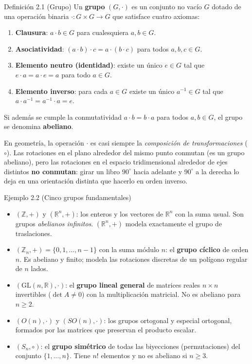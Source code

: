 \documentclass[11pt,letterpaper]{article}
\newcommand{\term}[1]{\textbf{\color{orangeacc}#1}}
\begin{document}
\begin{infobox}[orangeacc]{Definición 2.1 (Grupo)}
Un \term{grupo} $(G,\cdot)$ es un conjunto no vacío $G$ dotado de una operación binaria $\cdot:G\times G\to G$ que satisface cuatro axiomas:
\begin{enumerate}
  \item \term{Clausura}: $a\cdot b\in G$ para cualesquiera $a,b\in G$.
  \item \term{Asociatividad}: $(a\cdot b)\cdot c=a\cdot(b\cdot c)$ para todos $a,b,c\in G$.
  \item \term{Elemento neutro (identidad)}: existe un único $e\in G$ tal que $e\cdot a=a\cdot e=a$ para todo $a\in G$.
  \item \term{Elemento inverso}: para cada $a\in G$ existe un único $a^{-1}\in G$ tal que $a\cdot a^{-1}=a^{-1}\cdot a=e$.
\end{enumerate}
Si además se cumple la conmutatividad $a\cdot b=b\cdot a$ para todos $a,b\in G$, el grupo se denomina \term{abeliano}.
\end{infobox}

En geometría, la operación $\cdot$ es casi siempre la \emph{composición de transformaciones} ($\circ$). Las rotaciones en el plano alrededor del mismo punto conmutan (es un grupo abeliano), pero las rotaciones en el espacio tridimensional alrededor de ejes distintos \textbf{no conmutan}: girar un libro $90^\circ$ hacia adelante y $90^\circ$ a la derecha lo deja en una orientación distinta que hacerlo en orden inverso.

\begin{examplebox}{Ejemplo 2.2 (Cinco grupos fundamentales)}
\begin{itemize}
  \item $(\mathbb{Z},+)$ y $(\mathbb{R}^n,+)$: los enteros y los vectores de $\mathbb{R}^n$ con la suma usual. Son grupos \emph{abelianos infinitos}. $(\mathbb{R}^n,+)$ modela exactamente el grupo de traslaciones.
  \item $(\mathbb{Z}_n,+)=\{0,1,\dots,n-1\}$ con la suma módulo $n$: el \term{grupo cíclico} de orden $n$. Es abeliano y finito; modela las rotaciones discretas de un polígono regular de $n$ lados.
  \item $(\mathrm{GL}(n,\mathbb{R}),\cdot)$: el \term{grupo lineal general} de matrices reales $n\times n$ invertibles ($\det A\neq 0$) con la multiplicación matricial. No es abeliano para $n\ge 2$.
  \item $(O(n),\cdot)$ y $(SO(n),\cdot)$: los grupos ortogonal y especial ortogonal, formados por las matrices que preservan el producto escalar.
  \item $(S_n,\circ)$: el \term{grupo simétrico} de todas las biyecciones (permutaciones) del conjunto $\{1,\dots,n\}$. Tiene $n!$ elementos y no es abeliano si $n\ge 3$.
\end{itemize}
\end{examplebox}
\end{document}
